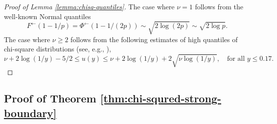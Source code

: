 \begin{proof}[Proof of Lemma \ref{lemma:chisq-quantiles}]
The case where $\nu=1$ follows from the well-known Normal quantiles 
$$
F^\leftarrow(1 - 1/p) = \Phi^\leftarrow(1-1/(2p))\sim\sqrt{2\log{(2p)}}\sim\sqrt{2\log{p}}.
$$
The case where $\nu\ge2$ follows from the following estimates of high quantiles of chi-square distributions (see, e.g., \citep{inglot2010inequalities}),
$$
    \nu +  2\log(1/y) -5/2 \le u(y) \le \nu +  2\log(1/y) + 2\sqrt{\nu\log(1/y)}, \quad \text{for all }y\le0.17.
$$
\end{proof}


\subsection{Proof of Theorem \ref{thm:chi-squred-strong-boundary}}
\label{subsec:proof-chi-squred-strong-boundary}

